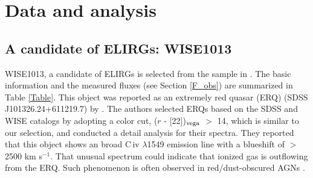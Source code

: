 \documentclass[twocolumn]{aastex6}
\begin{document}
\section{Data and analysis}
\subsection{A candidate of ELIRGs: WISE1013}
\label{WISE1013}
WISE1013, a candidate of ELIRGs is selected from the sample in \cite{Toba_16}.
The basic information and the measured fluxes (see Section \ref{F_obs}) are summarized in Table \ref{Table}.
This object was reported as an extremely red quasar (ERQ) (SDSS J101326.24+611219.7) by \cite{Hamann}.
The authors selected ERQs based on the SDSS and WISE catalogs by adopting a color cut, ($r$ - [22])$_{\rm vega}$ $>$ 14, which is similar to our selection, and conducted a detail analysis for their spectra.
They reported that this object shows an broad C{\,\sc iv} $\lambda$1549 emission line with a blueshift of  $>$ 2500 km s$^{-1}$.
That unusual spectrum could indicate that ionized gas is outflowing from the ERQ.
Such phenomenon is often observed in red/dust-obscured AGNs \citep[e.g.,][]{Zakamska,Toba_17c}. 
\end{document}
